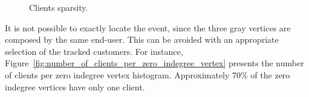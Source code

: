 \begin{figure}[H]
    \centering
    \caption{Clients sparsity.}
\label{fig:clients_sparsity}
\end{figure}%

It is not possible to exactly locate the event,
since the three gray vertices are composed by the same end-user.
This can be avoided with an appropriate selection of the tracked customers.
For instance,
Figure~\ref{fig:number_of_clients_per_zero_indegree_vertex} presents
the number of clients per zero indegree vertex histogram.
Approximately 70\% of the zero indegree vertices have only one client.

